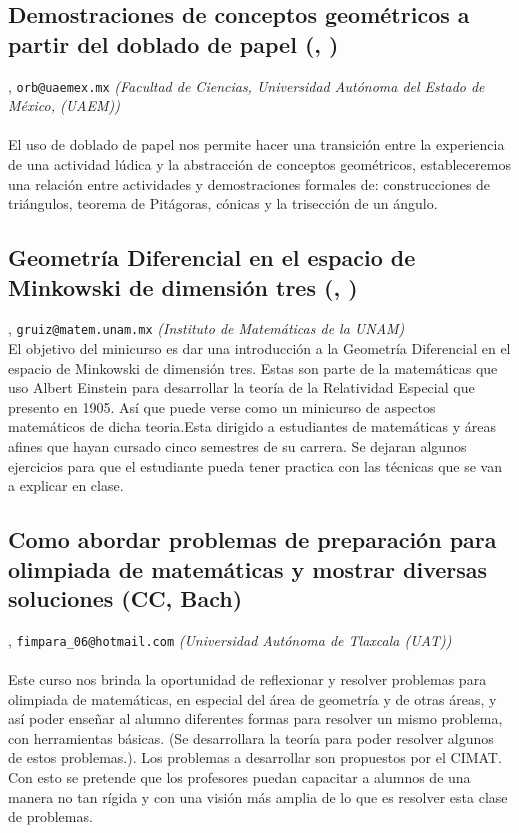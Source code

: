 \subsection{\sffamily Demostraciones de conceptos geométricos a partir del doblado de papel {\footnotesize (, )}} \label{reg-1019} 
, {\tt orb@uaemex.mx}  {\slshape (Facultad de Ciencias, Universidad Autónoma del Estado de México, (UAEM))}\\
\\
\noindent El uso de doblado de papel nos permite hacer una transición entre la experiencia de una actividad lúdica y la abstracción de conceptos geométricos, estableceremos una relación entre actividades y demostraciones formales de: construcciones de triángulos, teorema de Pitágoras, cónicas y la trisección de un ángulo.
\subsection{\sffamily Geometría  Diferencial en el espacio de Minkowski de dimensión tres {\footnotesize (, )}} \label{reg-347} 
, {\tt gruiz@matem.unam.mx}  {\slshape (Instituto de Matemáticas de la UNAM)}\\
          \noindent El objetivo del minicurso es dar una introducción a la Geometría Diferencial en el espacio de Minkowski de dimensión tres. Estas son parte de la matemáticas que uso Albert Einstein para desarrollar la teoría de la Relatividad Especial que presento en 1905. Así que puede verse como un minicurso de aspectos matemáticos de dicha teoria.Esta dirigido a estudiantes de matemáticas y áreas afines que hayan cursado cinco semestres de su carrera. Se dejaran algunos ejercicios para que el estudiante pueda tener practica con las técnicas que se van a explicar en clase.
\subsection{\sffamily Como abordar problemas de preparación para olimpiada de matemáticas  y mostrar diversas soluciones {\footnotesize (CC, Bach)}} \label{reg-1615} 
, {\tt fimpara_06@hotmail.com}  {\slshape (Universidad Autónoma de Tlaxcala (UAT))}\\
\\
\noindent Este curso nos brinda la oportunidad de reflexionar y resolver problemas para olimpiada de matemáticas, en especial del área de geometría y de otras áreas, y así poder enseñar al alumno diferentes formas para resolver un mismo problema, con herramientas básicas.  (Se desarrollara la teoría para poder resolver algunos de estos problemas.).  Los problemas a desarrollar son propuestos por el  CIMAT. Con esto se pretende que los  profesores puedan capacitar a alumnos de una manera no tan rígida y con una visión más amplia de lo que es resolver esta clase de problemas.
